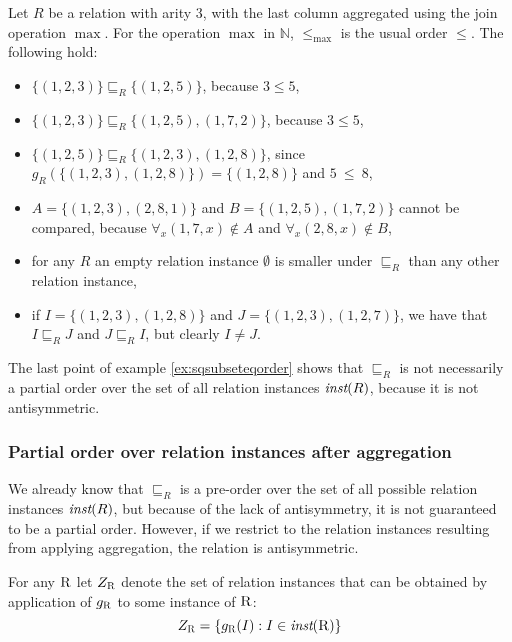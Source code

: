 \begin{exmp}
Let $R$ be a relation with arity $3$, with the last column aggregated using the join operation $\max$.
For the operation $ \max $ in $\mathbb{N}$, $ \le_{\max} $ is the usual order $ \le $. The following hold:
\begin{itemize}
\item $\{(1, 2, 3)\} \sqsubseteq_R \{(1, 2, 5)\}$, because $3 \le 5$,
\item $\{(1, 2, 3)\} \sqsubseteq_R \{(1, 2, 5), (1, 7, 2)\}$, because $3 \le 5$,
\item $\{(1, 2, 5)\} \sqsubseteq_R \{(1, 2, 3), (1, 2, 8)\}$, since $g_R(\{(1, 2, 3), (1, 2, 8)\}) = \{(1,2,8)\}$ and $5~\le~8$,
\item $A = \{(1, 2, 3), (2, 8, 1)\}$ and  $B = \{(1, 2, 5), (1, 7, 2)\}$ cannot be compared, because $\forall_x (1, 7, x) \notin A$ and $\forall_x (2, 8, x) \notin B$,
\item for any $R$ an empty relation instance $\emptyset$ is smaller under $\sqsubseteq_R$  than any other relation instance,
\item if $I = \{(1, 2, 3), (1, 2, 8)\}$ and $J = \{(1, 2, 3), (1, 2, 7)\}$, we have that $I \sqsubseteq_R J$ and $J \sqsubseteq_R I$, but clearly $I \ne J$.
\end{itemize}
\label{ex:sqsubseteqorder}
\end{exmp}

The last point of example \ref{ex:sqsubseteqorder} shows that $\sqsubseteq_R$ is not necessarily a partial order over the set of all relation instances $\textit{inst}(R)$, because it is not antisymmetric. 


\subsubsection{Partial order over relation instances after aggregation}

We already know that $\sqsubseteq_R$ is a pre-order over the set of all possible relation instances $\textit{inst}(R)$, but because of the lack of antisymmetry, it is not guaranteed to be a partial order. However, if we restrict to the relation instances resulting from applying aggregation, the relation is antisymmetric.


For any $\textsc{R}$ let $Z_\textsc{R}$ denote the set of relation instances that can be obtained by application of $g_\textsc{R}$ to some instance of $\textsc{R}$:
$$Z_\textsc{R} = \{g_\textsc{R}(I): I \in \textit{inst}(\textsc{R})\}$$

